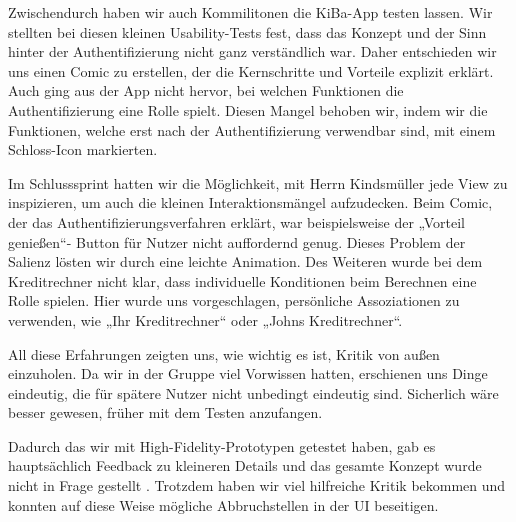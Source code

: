	Zwischendurch haben wir auch Kommilitonen die KiBa-App testen lassen. Wir stellten bei diesen kleinen Usability-Tests fest, dass das Konzept und der Sinn hinter der Authentifizierung nicht ganz verständlich war. Daher entschieden wir uns einen Comic zu erstellen, der die Kernschritte und Vorteile explizit erklärt. Auch ging aus der App nicht hervor, bei welchen Funktionen die Authentifizierung eine Rolle spielt. Diesen Mangel behoben wir, indem wir die Funktionen, welche erst nach der Authentifizierung verwendbar sind, mit einem Schloss-Icon markierten.
	
	Im Schlusssprint hatten wir die Möglichkeit, mit Herrn Kindsmüller jede View zu inspizieren, um auch die kleinen Interaktionsmängel aufzudecken. Beim Comic, der das Authentifizierungsverfahren erklärt, war beispielsweise der „Vorteil genießen“- Button für Nutzer nicht auffordernd genug. Dieses Problem der Salienz lösten wir durch eine leichte Animation. Des Weiteren wurde bei dem Kreditrechner nicht klar, dass individuelle Konditionen beim Berechnen eine Rolle spielen. Hier wurde uns vorgeschlagen, persönliche Assoziationen zu verwenden, wie „Ihr  Kreditrechner“ oder „Johns Kreditrechner“.

	All diese Erfahrungen zeigten uns, wie wichtig es ist, Kritik von außen einzuholen. Da wir in der Gruppe viel Vorwissen hatten, erschienen uns Dinge eindeutig, die für spätere Nutzer nicht unbedingt eindeutig sind. Sicherlich wäre besser gewesen, früher mit dem Testen anzufangen.

	Dadurch das wir mit High-Fidelity-Prototypen getestet haben, gab es hauptsächlich Feedback zu kleineren Details und das gesamte Konzept wurde nicht in Frage gestellt \citep{Walker02}. Trotzdem haben wir viel hilfreiche Kritik bekommen und konnten auf diese Weise mögliche Abbruchstellen in der UI beseitigen.
